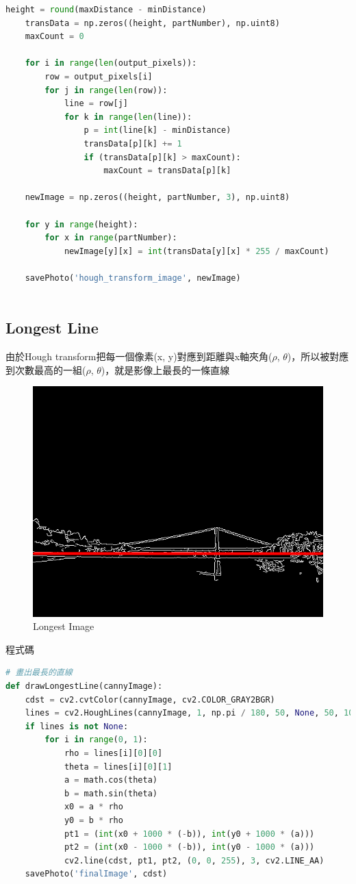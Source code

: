 \documentclass[12pt,a4paper]{article}
\begin{document}
{\begin{lstlisting}[language=Python]
    height = round(maxDistance - minDistance)
    transData = np.zeros((height, partNumber), np.uint8)
    maxCount = 0

    for i in range(len(output_pixels)):
        row = output_pixels[i]
        for j in range(len(row)):
            line = row[j]
            for k in range(len(line)):
                p = int(line[k] - minDistance)
                transData[p][k] += 1
                if (transData[p][k] > maxCount):
                    maxCount = transData[p][k]

    newImage = np.zeros((height, partNumber, 3), np.uint8)

    for y in range(height):
        for x in range(partNumber):
            newImage[y][x] = int(transData[y][x] * 255 / maxCount)

    savePhoto('hough_transform_image', newImage)
    
\end{lstlisting}
}

\subsection{Longest Line}
{
由於Hough transform把每一個像素(x, y)對應到距離與x軸夾角($\rho$, $\theta$)，所以被對應到次數最高的一組($\rho$, $\theta$)，就是影像上最長的一條直線
\begin{figure}[ht]
\centering
\includegraphics[width=.7\textwidth]{image/finalImage.png}
\caption{Longest Image}%
\label{要合併的兩張圖}%
\end{figure}

\newpage
程式碼
\begin{lstlisting}[language=Python]
# 畫出最長的直線
def drawLongestLine(cannyImage):
    cdst = cv2.cvtColor(cannyImage, cv2.COLOR_GRAY2BGR)
    lines = cv2.HoughLines(cannyImage, 1, np.pi / 180, 50, None, 50, 10)
    if lines is not None:
        for i in range(0, 1):
            rho = lines[i][0][0]
            theta = lines[i][0][1]
            a = math.cos(theta)
            b = math.sin(theta)
            x0 = a * rho
            y0 = b * rho
            pt1 = (int(x0 + 1000 * (-b)), int(y0 + 1000 * (a)))
            pt2 = (int(x0 - 1000 * (-b)), int(y0 - 1000 * (a)))
            cv2.line(cdst, pt1, pt2, (0, 0, 255), 3, cv2.LINE_AA)
    savePhoto('finalImage', cdst)
    
\end{lstlisting}
}
\end{document}
